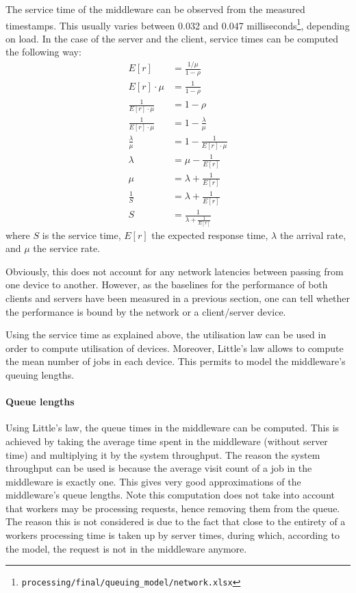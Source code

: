 \documentclass[11pt,a4paper]{article}
\begin{document}
The service time of the middleware can be observed from the measured timestamps. This usually varies between 0.032 and 0.047 milliseconds\footnote{\label{source::q_network}\texttt{processing/final/queuing_model/network.xlsx}}, depending on load. In the case of the server and the client, service times can be computed the following way:
\begin{align}
    E[r] &= \frac{1/\mu}{1 - \rho}\\
    E[r] \cdot\mu &= \frac{1}{1 - \rho}\\
    \frac{1}{E[r]\cdot\mu} &= 1 - \rho\\
    \frac{1}{E[r]\cdot\mu} &= 1 - \frac{\lambda}{\mu}\\
    \frac{\lambda}{\mu} &= 1 - \frac{1}{E[r]\cdot\mu}\\
    \lambda &= \mu - \frac{1}{E[r]}\\
    \mu &= \lambda + \frac{1}{E[r]}\\
    \frac{1}{S} &= \lambda + \frac{1}{E[r]}\\
    S &= \frac{1}{\lambda + \frac{1}{E[r]}} \label{eq::service_time}
\end{align}
where $S$ is the service time, $E[r]$ the expected response time, $\lambda$ the arrival rate, and $\mu$ the service rate.

Obviously, this does not account for any network latencies between passing from one device to another. However, as the baselines for the performance of both clients and servers have been measured in a previous section, one can tell whether the performance is bound by the network or a client/server device.

Using the service time as explained above, the utilisation law can be used in order to compute utilisation of devices. Moreover, Little's law allows to compute the mean number of jobs in each device. This permits to model the middleware's queuing lengths.

\paragraph{Queue lengths}
Using Little's law, the queue times in the middleware can be computed. This is achieved by taking the average time spent in the middleware (without server time) and multiplying it by the system throughput. The reason the system throughput can be used is because the average visit count of a job in the middleware is exactly one. This gives very good approximations of the middleware's queue lengths. Note this computation does not take into account that workers may be processing requests, hence removing them from the queue. The reason this is not considered is due to the fact that close to the entirety of a workers processing time is taken up by server times, during which, according to the model, the request is not in the middleware anymore.
\end{document}
